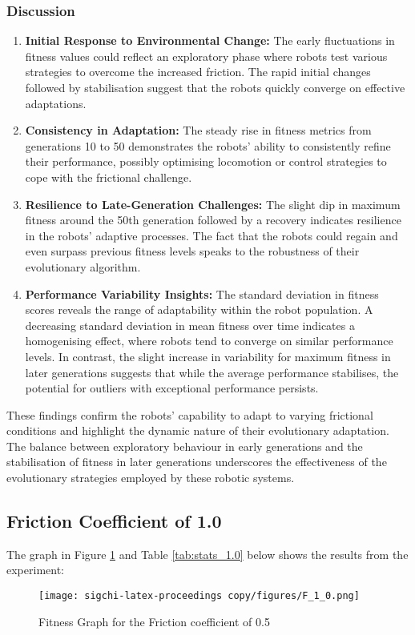 \documentclass{sigchi}
\begin{document}
\subsubsection{Discussion}

\begin{enumerate}
    \item \textbf{Initial Response to Environmental Change:} The early fluctuations in fitness values could reflect an exploratory phase where robots test various strategies to overcome the increased friction. The rapid initial changes followed by stabilisation suggest that the robots quickly converge on effective adaptations.
    
    \item \textbf{Consistency in Adaptation:} The steady rise in fitness metrics from generations 10 to 50 demonstrates the robots' ability to consistently refine their performance, possibly optimising locomotion or control strategies to cope with the frictional challenge.
    
    \item \textbf{Resilience to Late-Generation Challenges:} The slight dip in maximum fitness around the 50th generation followed by a recovery indicates resilience in the robots' adaptive processes. The fact that the robots could regain and even surpass previous fitness levels speaks to the robustness of their evolutionary algorithm.
    
    \item \textbf{Performance Variability Insights:} The standard deviation in fitness scores reveals the range of adaptability within the robot population. A decreasing standard deviation in mean fitness over time indicates a homogenising effect, where robots tend to converge on similar performance levels. In contrast, the slight increase in variability for maximum fitness in later generations suggests that while the average performance stabilises, the potential for outliers with exceptional performance persists.
\end{enumerate}

These findings confirm the robots' capability to adapt to varying frictional conditions and highlight the dynamic nature of their evolutionary adaptation. The balance between exploratory behaviour in early generations and the stabilisation of fitness in later generations underscores the effectiveness of the evolutionary strategies employed by these robotic systems.


\subsection{Friction Coefficient of 1.0}
The graph in Figure \ref{fig:f1.0}  and Table \ref{tab:stats_1.0} below shows the results from the experiment:
\begin{figure}[h!]
    \centering
    \texttt{[image: sigchi-latex-proceedings copy/figures/F\_1\_0.png]}
    \caption{Fitness Graph for the Friction coefficient of 0.5}
    \label{fig:f1.0}
\end{figure}
\end{document}

